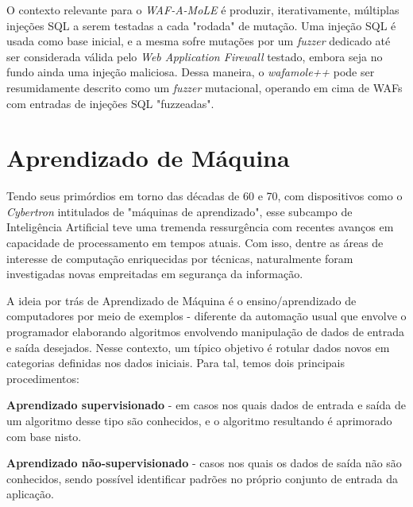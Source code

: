 
O contexto relevante para o \textit{WAF-A-MoLE} é produzir, iterativamente, múltiplas injeções SQL a serem testadas a cada "rodada" de mutação. Uma injeção SQL é usada como base inicial, e a mesma sofre mutações por um \textit{fuzzer} dedicado até ser considerada válida pelo \textit{Web Application Firewall} testado, embora seja no fundo ainda uma injeção maliciosa. Dessa maneira, o \textit{wafamole++} pode ser resumidamente descrito como um \textit{fuzzer} mutacional, operando em cima de WAFs com entradas de injeções SQL "fuzzeadas".

\section{Aprendizado de Máquina}

Tendo seus primórdios em torno das décadas de 60 e 70, com dispositivos como o \textit{Cybertron} intitulados de "máquinas de aprendizado", esse subcampo de Inteligência Artificial teve uma tremenda ressurgência com recentes avanços em capacidade de processamento em tempos atuais. Com isso, dentre as áreas de interesse de computação enriquecidas por técnicas, naturalmente foram investigadas novas empreitadas em segurança da informação.

A ideia por trás de Aprendizado de Máquina \cite{dantas_transformers_2021} é o ensino/aprendizado de computadores por meio de exemplos - diferente da automação usual que envolve o programador elaborando algoritmos envolvendo manipulação de dados de entrada e saída desejados. Nesse contexto, um típico objetivo é rotular dados novos em categorias definidas nos dados iniciais. Para tal, temos dois principais procedimentos:
\begin{alineas}
\item \textbf{Aprendizado supervisionado} - em casos nos quais dados de entrada e saída de um algoritmo desse tipo são conhecidos, e o algoritmo resultando é aprimorado com base nisto.
\item \textbf{Aprendizado não-supervisionado} - casos nos quais os dados de saída não são conhecidos, sendo possível identificar padrões no próprio conjunto de entrada da aplicação.
\end{alineas}

